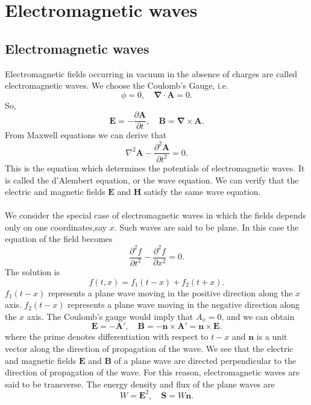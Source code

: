 \section{Electromagnetic waves}
\subsection{Electromagnetic waves}
Electromagnetic fields occurring in vacuum in the absence of  charges are called electromagnetic waves. We choose the Coulomb's Gauge, i.e.
\[ \phi = 0 , \quad \bm{\nabla} \cdot \bm{A} = 0.\]
So,
\[\bm{E} = -\frac{\partial \bm{A}}{\partial t} , \quad \bm{B} = \bm{\nabla} \times \bm{A}.\]
From Maxwell equations we can derive that
\[\nabla^2 \bm{A} - \frac{\partial^2 \bm{A}}{\partial t^2} = 0.\]
This is the equation which determines the potentials of electromagnetic waves. It is called the d'Alembert equation, or the wave equation. We can verify that the electric and magnetic fields $\bm{E}$ and $\bm{H}$ satisfy the same wave equation.
\\ \\
We consider the special case of electromagnetic waves in which the fields depends only on one coordinates,say $x$. Such waves are said to be plane. In this case the equation of the field becomes
\[\frac{\partial^2 f}{\partial t^2}  - \frac{\partial^2 f}{\partial x^2} = 0.\]
The solution is
\[f(t,x) = f_1(t-x) + f_2(t+x).\]
$f_1(t-x)$ represents a plane wave moving in the positive direction along the $x$ axis. $f_2(t-x)$ represents a plane wave moving in the negative direction along the $x$ axis. The Coulomb's gauge would imply that $A_x = 0$, and we can obtain
\[\bm{E} = -\bm{A}' , \quad \bm{B} = -\bm{n} \times \bm{A}' = \bm{n} \times \bm{E}.\]
where the prime denotes differentiation with respect to $t-x$ and $\bm{n}$ is a unit vector along the direction of propagation of the wave. We see that the electric and magnetic fields $\bm{E}$ and $\bm{B}$ of a plane wave are directed perpendicular to the direction of propagation of the wave. For this reason, electromagnetic waves are said to be transverse.
The energy density and flux of the plane waves are
\[W = \bm{E}^2 , \quad \bm{S} = W\bm{n}.\]

